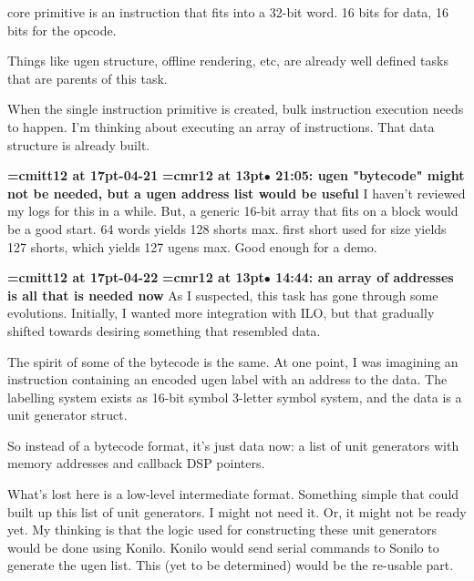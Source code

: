 core primitive is an instruction that fits into a 32-bit word. 16 bits for data, 16 bits for the opcode.
\par

Things like ugen structure, offline rendering, etc, are already well defined tasks that are parents of this task.
\par

When the single instruction primitive is created, bulk instruction execution needs to happen. I'm thinking about executing an array of instructions. That data structure is already built.
\par

{\medskip\noindent\bf\font\titlefont=cmitt12 at 17pt-04-21}\medskip
{\smallskip\noindent\bf\font\titlefont=cmr12 at 13pt\titlefont $\bullet$ 21:05: ugen "bytecode" might not be needed, but a ugen address list would be useful}\smallskip
I haven't reviewed my logs for this in a while. But, a generic 16-bit array that fits on a block would be a good start. 64 words yields 128 shorts max. first short used for size yields 127 shorts, which yields 127 ugens max. Good enough for a demo.
\par

{\medskip\noindent\bf\font\titlefont=cmitt12 at 17pt-04-22}\medskip
{\smallskip\noindent\bf\font\titlefont=cmr12 at 13pt\titlefont $\bullet$ 14:44: an array of addresses is all that is needed now}\smallskip
As I suspected, this task has gone through some evolutions. Initially, I wanted more integration with ILO, but that gradually shifted towards desiring something that resembled data.
\par

The spirit of some of the bytecode is the same. At one point, I was imagining an instruction containing an encoded ugen label with an address to the data. The labelling system exists as 16-bit symbol 3-letter symbol system, and the data is a unit generator struct.
\par

So instead of a bytecode format, it's just data now: a list of unit generators with memory addresses and callback DSP pointers.
\par

What's lost here is a low-level intermediate format. Something simple that could built up this list of unit generators. I might not need it. Or, it might not be ready yet. My thinking is that the logic used for constructing these unit generators would be done using Konilo. Konilo would send serial commands to Sonilo to generate the ugen list. This (yet to be determined) would be the re-usable part.
\par

